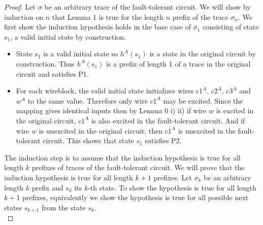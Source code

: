 \documentclass[12pt]{report}
\begin{document}
\begin{proof}
Let $\sigma$ be an arbitrary trace of the fault-tolerant circuit.  We will show by induction on $n$ that Lemma 1 is true for the length $n$ prefix of the trace $\sigma_n$.  
We first show the induction hypothesis holds in the base case of $\sigma_1$ consisting of state $s_1$, a valid initial state by construction.
\begin{itemize}
\item State $s_1$ is a valid initial state so $h^A(s_1)$ is a state in the original circuit by construction. %
 Thus $h^A(s_1)$ is a prefix of length 1 of a trace in the original circuit and satisfies P1.
\item 
For each wireblock, the valid initial state initializes wires $c1^A$, $c2^A$, $c3^A$ and $w^A$ to the same value.  Therefore only wire $c1^A$ may be excited.  Since the mapping gives identical inputs then by Lemma 0 i) ii) if wire $w$ is excited in the original circuit, $c1^A$ is also excited in the fault-tolerant circuit.
And if wire $w$ is unexcited in the original circuit, then $c1^A$ is unexcited in the fault-tolerant circuit.  This shows that state $s_1$ satisfies P2.    %
\end{itemize}

The induction step is to assume that the induction hypothesis is true for all length $k$ prefixes of traces of the fault-tolerant circuit.  We will prove that the induction hypothesis is true for all length $k+1$ prefixes.  %
Let $\sigma_k$ be an arbitrary length $k$ prefix and $s_k$ its $k$-th state.  
To show the hypothesis is true for all length $k+1$ prefixes, equivalently we show the hypothesis is true for all possible next states $s_{k+1}$ from the state $s_k$.\\


\end{proof}
\end{document}
